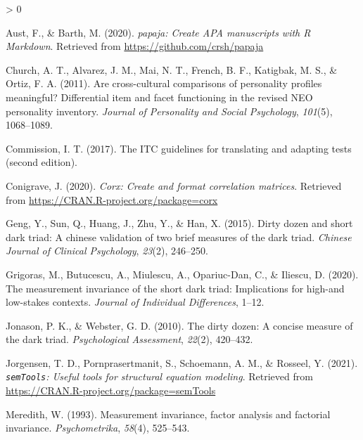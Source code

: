 \documentclass[
  english,
  man]{apa6}
\newlength{\cslhangindent}
\newenvironment{CSLReferences}[2] %
 {%
  \setlength{\parindent}{0pt}
  \ifodd #1 \everypar{\setlength{\hangindent}{\cslhangindent}}\ignorespaces\fi
  \ifnum #2 > 0
  \setlength{\parskip}{#2\baselineskip}
  \fi
 }%
 {}
\begin{document}
\begingroup
\setlength{\parindent}{-0.5in}
\setlength{\leftskip}{0.5in}

\hypertarget{refs}{}
\begin{CSLReferences}{1}{0}
\leavevmode\hypertarget{ref-R-papaja}{}%
Aust, F., \& Barth, M. (2020). \emph{{papaja}: {Create} {APA} manuscripts with {R Markdown}}. Retrieved from \url{https://github.com/crsh/papaja}

\leavevmode\hypertarget{ref-church2011cross}{}%
Church, A. T., Alvarez, J. M., Mai, N. T., French, B. F., Katigbak, M. S., \& Ortiz, F. A. (2011). Are cross-cultural comparisons of personality profiles meaningful? Differential item and facet functioning in the revised NEO personality inventory. \emph{Journal of Personality and Social Psychology}, \emph{101}(5), 1068--1089.

\leavevmode\hypertarget{ref-itc_2017}{}%
Commission, I. T. (2017). The ITC guidelines for translating and adapting tests (second edition).

\leavevmode\hypertarget{ref-R-corx}{}%
Conigrave, J. (2020). \emph{Corx: Create and format correlation matrices}. Retrieved from \url{https://CRAN.R-project.org/package=corx}

\leavevmode\hypertarget{ref-geng2015dirty}{}%
Geng, Y., Sun, Q., Huang, J., Zhu, Y., \& Han, X. (2015). Dirty dozen and short dark triad: A chinese validation of two brief measures of the dark triad. \emph{Chinese Journal of Clinical Psychology}, \emph{23}(2), 246--250.

\leavevmode\hypertarget{ref-grigoras2020measurement}{}%
Grigoras, M., Butucescu, A., Miulescu, A., Opariuc-Dan, C., \& Iliescu, D. (2020). The measurement invariance of the short dark triad: Implications for high-and low-stakes contexts. \emph{Journal of Individual Differences}, 1--12.

\leavevmode\hypertarget{ref-jonason2010dirty}{}%
Jonason, P. K., \& Webster, G. D. (2010). The dirty dozen: A concise measure of the dark triad. \emph{Psychological Assessment}, \emph{22}(2), 420--432.

\leavevmode\hypertarget{ref-R-semTools}{}%
Jorgensen, T. D., Pornprasertmanit, S., Schoemann, A. M., \& Rosseel, Y. (2021). \emph{\texttt{semTools}: {U}seful tools for structural equation modeling}. Retrieved from \url{https://CRAN.R-project.org/package=semTools}

\leavevmode\hypertarget{ref-meredith1993measurement}{}%
Meredith, W. (1993). Measurement invariance, factor analysis and factorial invariance. \emph{Psychometrika}, \emph{58}(4), 525--543.


\end{CSLReferences}
\end{document}
